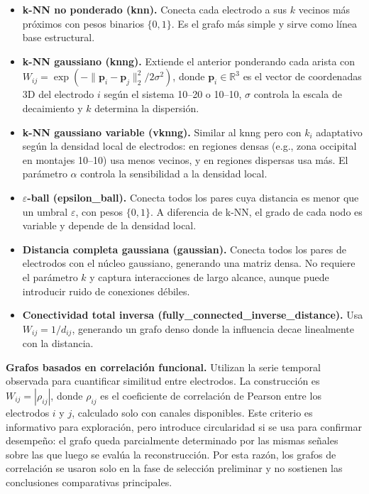 \begin{itemize}[leftmargin=*,itemsep=1pt,topsep=2pt]
\item \textbf{k-NN no ponderado (knn).} Conecta cada electrodo a sus $k$ vecinos más próximos con pesos binarios $\{0,1\}$. Es el grafo más simple y sirve como línea base estructural.
\item \textbf{k-NN gaussiano (knng).} Extiende el anterior ponderando cada arista con $W_{ij} = \exp(-\|\mathbf{p}_i - \mathbf{p}_j\|_2^2 / 2\sigma^2)$, donde $\mathbf{p}_i \in \mathbb{R}^3$ es el vector de coordenadas 3D del electrodo $i$ según el sistema 10--20 o 10--10, $\sigma$ controla la escala de decaimiento y $k$ determina la dispersión.
\item \textbf{k-NN gaussiano variable (vknng).} Similar al knng pero con $k_i$ adaptativo según la densidad local de electrodos: en regiones densas (e.g., zona occipital en montajes 10--10) usa menos vecinos, y en regiones dispersas usa más. El parámetro $\alpha$ controla la sensibilidad a la densidad local.
\item \textbf{$\varepsilon$-ball (epsilon\_ball).} Conecta todos los pares cuya distancia es menor que un umbral $\varepsilon$, con pesos $\{0,1\}$. A diferencia de k-NN, el grado de cada nodo es variable y depende de la densidad local.
\item \textbf{Distancia completa gaussiana (gaussian).} Conecta todos los pares de electrodos con el núcleo gaussiano, generando una matriz densa. No requiere el parámetro $k$ y captura interacciones de largo alcance, aunque puede introducir ruido de conexiones débiles.
\item \textbf{Conectividad total inversa (fully\_connected\_inverse\_distance).} Usa $W_{ij} = 1/d_{ij}$, generando un grafo denso donde la influencia decae linealmente con la distancia.
\end{itemize}

\textbf{Grafos basados en correlación funcional.} Utilizan la serie temporal observada para cuantificar similitud entre electrodos. La construcción es $W_{ij} = |\rho_{ij}|$, donde $\rho_{ij}$ es el coeficiente de correlación de Pearson entre los electrodos $i$ y $j$, calculado solo con canales disponibles. Este criterio es informativo para exploración, pero introduce circularidad si se usa para confirmar desempeño: el grafo queda parcialmente determinado por las mismas señales sobre las que luego se evalúa la reconstrucción. Por esta razón, los grafos de correlación se usaron solo en la fase de selección preliminar y no sostienen las conclusiones comparativas principales.

